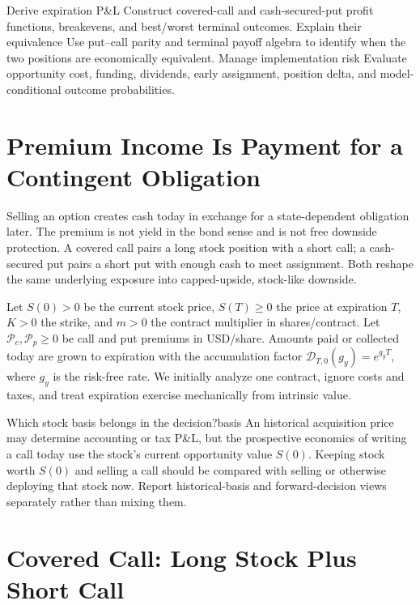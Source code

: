 \documentclass[11pt]{article}
\begin{document}

\learningobjectives
  {Derive expiration P\&L}
  {Construct covered-call and cash-secured-put profit functions, breakevens, and best/worst terminal outcomes.}
  {Explain their equivalence}
  {Use put--call parity and terminal payoff algebra to identify when the two positions are economically equivalent.}
  {Manage implementation risk}
  {Evaluate opportunity cost, funding, dividends, early assignment, position delta, and model-conditional outcome probabilities.}

\section{Premium Income Is Payment for a Contingent Obligation}

Selling an option creates cash today in exchange for a state-dependent obligation later. The premium is not yield in the bond sense and is not free downside protection. A covered call pairs a long stock position with a short call; a cash-secured put pairs a short put with enough cash to meet assignment. Both reshape the same underlying exposure into capped-upside, stock-like downside.

Let $S(0)>0$ be the current stock price, $S(T)\geq 0$ the price at expiration $T$, $K>0$ the strike, and $m>0$ the contract multiplier in shares/contract. Let $\mathcal P_c,\mathcal P_p\geq 0$ be call and put premiums in USD/share. Amounts paid or collected today are grown to expiration with the accumulation factor $\mathcal D_{T,0}(g_y)=e^{g_yT}$, where $g_y$ is the risk-free rate. We initially analyze one contract, ignore costs and taxes, and treat expiration exercise mechanically from intrinsic value.

\begin{remark}{Which stock basis belongs in the decision?}{basis}
An historical acquisition price may determine accounting or tax P\&L, but the prospective economics of writing a call today use the stock's current opportunity value $S(0)$. Keeping stock worth $S(0)$ and selling a call should be compared with selling or otherwise deploying that stock now. Report historical-basis and forward-decision views separately rather than mixing them.
\end{remark}

\section{Covered Call: Long Stock Plus Short Call}
\end{document}
